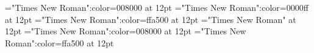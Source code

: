 \documentclass[a4paper]{article}
\begin{document}
 
\pagestyle{plain} 
\font\xitemenxitemmain="Times New Roman":color=008000 at 12pt
\font\xitemxitemmain="Times New Roman":color=0000ff at 12pt
\font\xitemenmain="Times New Roman":color=ffa500 at 12pt
\font\main="Times New Roman" at 12pt
\font\xitemenxitem="Times New Roman":color=008000 at 12pt
\font\xitemen="Times New Roman":color=ffa500 at 12pt
\pagestyle{fancy} 








\end{document}
